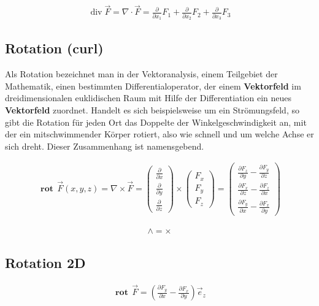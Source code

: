 \documentclass[a4paper]{scrartcl}
\begin{document}
\begin{align}
\operatorname{div}\vec F = \nabla \cdot \vec F =
\frac{\partial}{\partial x_1}F_1 + \frac{\partial}{\partial x_2}F_2+ \frac{\partial}{\partial x_3}F_3
\end{align}

\subsection{Rotation (curl)}
Als Rotation bezeichnet man in der Vektoranalysis, einem Teilgebiet der
Mathematik, einen bestimmten Differentialoperator, der einem \textbf{Vektorfeld}
im dreidimensionalen euklidischen Raum mit Hilfe der Differentiation ein neues
\textbf{Vektorfeld} zuordnet. Handelt es sich beispielsweise um ein
Strömungsfeld, so gibt die Rotation für jeden Ort das Doppelte der Winkelgeschwindigkeit an, mit
der ein mitschwimmender Körper rotiert, also wie schnell und um welche Achse er
sich dreht. Dieser Zusammenhang ist namensgebend.

\begin{align}
\mathbf{\operatorname{rot}}\,\vec F(x,y,z) = \nabla\times \vec F =
\begin{pmatrix} \frac{\partial}{\partial x} \\ \frac{\partial}{\partial y} \\
\frac{\partial}{\partial z} \end{pmatrix} \times \begin{pmatrix} F_x\\ F_y\\ F_z
\end{pmatrix} = \begin{pmatrix} \frac{\partial F_z}{\partial y} - \frac{\partial
F_y}{\partial z} \\ \frac{\partial F_x}{\partial z} - \frac{\partial
F_z}{\partial x} \\ \frac{\partial F_y}{\partial x} - \frac{\partial
F_x}{\partial y} \end{pmatrix}
\end{align}

\begin{align}
\mathbf{\wedge = \times}
\end{align}

\subsection{Rotation 2D}
\begin{align}
\mathbf{\operatorname{rot}}\,\vec F = \left (\frac{\partial
F_y}{\partial x} - \frac{\partial F_x}{\partial y}\right )\vec e_z 
\end{align}
\end{document}
